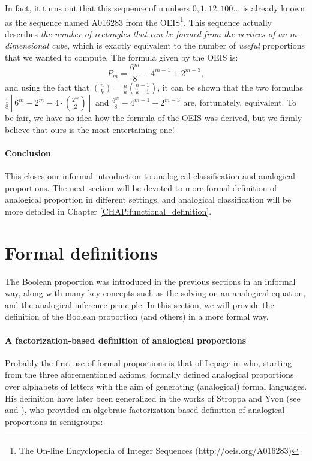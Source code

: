 In fact, it turns out that this sequence of numbers $0, 1, 12, 100\dots$ is
already known as the sequence named A016283 from the OEIS\footnote{The On-line
Encyclopedia of Integer Sequences (http://oeis.org/A016283)}.
This sequence actually describes \textit{the number of rectangles that can be
formed from the vertices of an $m$-dimensional cube}, which is exactly
equivalent to the number of \textit{useful} proportions that we wanted to
compute. The formula given by the OEIS is:
$$P_m = \frac{6^m}{8} - 4^{m - 1} + 2^{m - 3},$$
and using the fact that $\binom{n}{k} = \frac{n}{k}\binom{n - 1}{k - 1}$, it
can be shown that the two formulas $\frac{1}{8} \left[6^m - 2^m -
4\cdot\binom{2^m}{2} \right]$ and $\frac{6^m}{8} - 4^{m - 1} + 2^{m- 3}$ are,
fortunately, equivalent.  To be fair, we have no idea how the formula of the
OEIS was derived, but we firmly believe that ours is the most entertaining one!

\paragraph{Conclusion\\}

This closes our informal introduction to analogical classification and
analogical proportions. The next section will be devoted to more formal
definition of analogical proportion in different settings, and analogical
classification will be more detailed in Chapter
\ref{CHAP:functional_definition}.

\section{Formal definitions}
\label{SEC:formal_definitions_proportions}

The Boolean proportion was introduced in the previous sections in an informal
way, along with many key concepts such as the solving on an analogical
equation, and the analogical inference principle. In this section, we will
provide the definition of the Boolean proportion (and others) in a more formal
way.

\paragraph{A factorization-based definition of analogical proportions\\}

Probably the first use of formal proportions is that of Lepage in \cite{Lep04}
who, starting from the three aforementioned axioms, formally defined analogical
proportions over alphabets of letters with the aim of generating (analogical)
formal languages. His definition have later been generalized in the works of
Stroppa and Yvon (see \cite{StrYvoCNLL05} and \cite{StrYvoREPORT05}), who
provided an algebraic factorization-based definition of analogical proportions
in semigroups:

